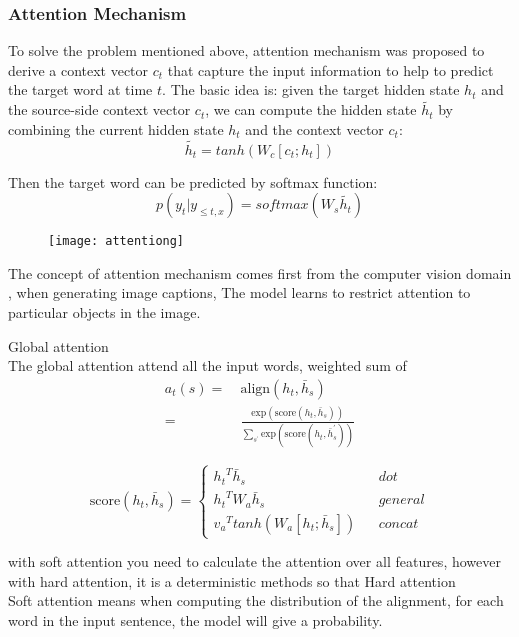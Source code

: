 	\subsubsection{Attention Mechanism}
	To solve the problem mentioned above, attention mechanism was proposed to derive a context vector ${c_t}$ that capture the input information to help to predict the target word at time ${t}$. The basic idea is: given the target hidden state ${h_t}$ and the source-side context vector ${c_t}$, we can compute the hidden state ${\tilde{h_t}}$ by combining the current hidden state ${h_t}$ and the context vector ${c_t}$:
		\[ \tilde{h_t} = tanh(W_c[c_t; h_t])\]
	
	Then the target word can be predicted by softmax function:
	\[ p(y_t| y_{\le t, x}) = softmax(W_s \tilde{h_t})\] 

	\begin{figure}[t]
		\texttt{[image: attentiong]}
		\centering
	\end{figure}
	The concept of attention mechanism comes first from the computer vision domain \cite{xu2015show}, when generating image captions,  The model learns to restrict attention to particular objects in the image.
	
	\cite{bahdanau2014neural}
	Global attention \\
	The global attention attend all the input words, weighted sum of 
	\begin{align}
	a_t(s) = & \ \text{align}(h_t, \bar{h}_s) \\
		   = & \ \frac{\text{exp}(\text{score}(h_t, \bar{h}_s))}{\sum_{s^{\prime}} \text{exp}(\text{score}(h_t, \bar{h}_s^{\prime}))}
	\end{align}
	
	\begin{equation}
	\text{score}(h_t, \bar{h}_s)=\left\{
	\begin{array}{lcl}
	{h_t}^T \bar{h}_s & & dot\\
	{h_t}^T W_a \bar{h}_s & & general\\
	{v_a}^T tanh(W_a[h_t; \bar{h}_s]) & & concat
	\end{array} \right.
	\end{equation}
	
	 with soft attention you need to calculate the attention over all features, however with hard attention, it is a deterministic methods so that 
	Hard attention \\
	Soft attention means when computing the distribution of the alignment, for each word in the input sentence, the model will give a probability.
	
